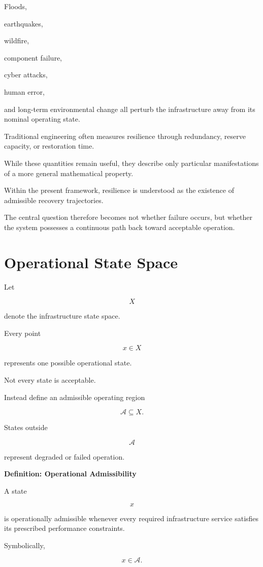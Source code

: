 \documentclass[11pt,fleqn]{book}
\numberwithin{equation}{chapter}
\newenvironment{definition}[1]
  {\begin{definitionEnv}
   \noindent\textbf{Definition: #1}\par\smallskip}
  {\end{definitionEnv}}
\theoremstyle{plain}
\theoremstyle{definition}
\theoremstyle{remark}
\begin{document}
Floods,

earthquakes,

wildfire,

component failure,

cyber attacks,

human error,

and long-term environmental change all perturb the infrastructure away
from its nominal operating state.

Traditional engineering often measures resilience through redundancy,
reserve capacity, or restoration time.

While these quantities remain useful, they describe only particular
manifestations of a more general mathematical property.

Within the present framework, resilience is understood as the existence
of admissible recovery trajectories.

The central question therefore becomes not whether failure occurs, but
whether the system possesses a continuous path back toward acceptable
operation.


\section{Operational State Space}

Let

\[
X
\]

denote the infrastructure state space.

Every point

\[
x\in X
\]

represents one possible operational state.

Not every state is acceptable.

Instead define an admissible operating region

\[
\mathcal A
\subseteq
X.
\]

States outside

\[
\mathcal A
\]

represent degraded or failed operation.


\begin{definition}{Operational Admissibility}

A state

\[
x
\]

is operationally admissible whenever every required infrastructure
service satisfies its prescribed performance constraints.

Symbolically,

\[
x\in\mathcal A.
\]

\end{definition}
\end{document}
